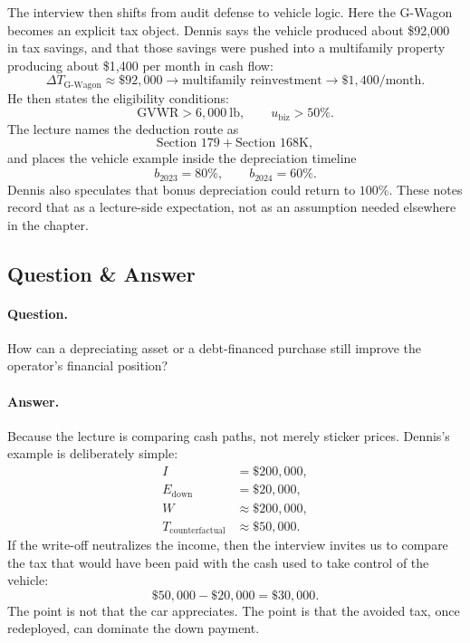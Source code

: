 The interview then shifts from audit defense to vehicle logic. Here the G-Wagon becomes an explicit tax object. Dennis says the vehicle produced about \$92{,}000 in tax savings, and that those savings were pushed into a multifamily property producing about \$1{,}400 per month in cash flow:
\begin{equation}
\Delta T_{\mathrm{G\text{-}Wagon}} \approx \$92{,}000
\to
\text{multifamily reinvestment}
\to
\$1{,}400/\text{month}.
\end{equation}
He then states the eligibility conditions:
\begin{equation}
\mathrm{GVWR} > 6{,}000\ \text{lb},
\qquad
u_{\mathrm{biz}} > 50\%.
\end{equation}
The lecture names the deduction route as
\begin{equation}
\text{Section }179 + \text{Section }168\mathrm{K},
\end{equation}
and places the vehicle example inside the depreciation timeline
\begin{equation}
b_{2023}=80\%,
\qquad
b_{2024}=60\%.
\end{equation}
Dennis also speculates that bonus depreciation could return to \(100\%\). These notes record that as a lecture-side expectation, not as an assumption needed elsewhere in the chapter.

\subsection{Question \& Answer}

\paragraph{Question.} How can a depreciating asset or a debt-financed purchase still improve the operator's financial position?

\paragraph{Answer.} Because the lecture is comparing cash paths, not merely sticker prices. Dennis's example is deliberately simple:
\begin{align}
I &= \$200{,}000, \\
E_{\mathrm{down}} &= \$20{,}000, \\
W &\approx \$200{,}000, \\
T_{\mathrm{counterfactual}} &\approx \$50{,}000.
\end{align}
If the write-off neutralizes the income, then the interview invites us to compare the tax that would have been paid with the cash used to take control of the vehicle:
\begin{equation}
\$50{,}000 - \$20{,}000 = \$30{,}000.
\end{equation}
The point is not that the car appreciates. The point is that the avoided tax, once redeployed, can dominate the down payment.

